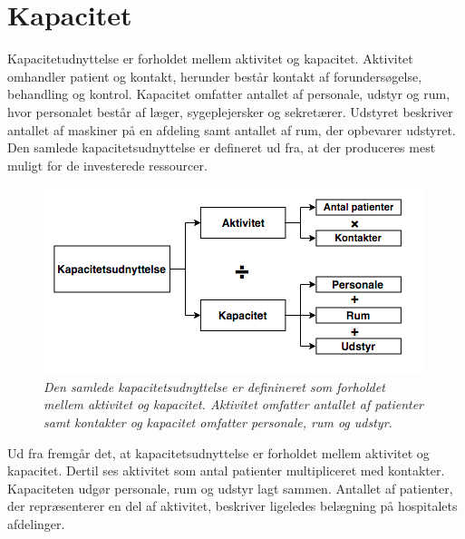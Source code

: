 \section{Kapacitet} \label{sec:kap}
Kapacitetudnyttelse er forholdet mellem aktivitet og kapacitet. Aktivitet omhandler patient og kontakt, herunder består kontakt af forundersøgelse, behandling og kontrol. Kapacitet omfatter antallet af personale, udstyr og rum, hvor personalet består af læger, sygeplejersker og sekretærer. Udstyret beskriver antallet af maskiner på en afdeling samt antallet af rum, der opbevarer udstyret. Den samlede kapacitetsudnyttelse er defineret ud fra, at der produceres mest muligt for de investerede ressourcer.\cite{Company2013} 

\begin{figure}[H]
	\flushleft 
	\centering
	\includegraphics[scale=1]{figures/Kapacitetsudnyttelse.png}
	\flushleft
	\caption{\textit{Den samlede kapacitetsudnyttelse er definineret som forholdet mellem aktivitet og kapacitet. Aktivitet omfatter antallet af patienter samt kontakter og kapacitet omfatter personale, rum og udstyr.}\cite{Company2013}}
	\label{kapacitet}
\end{figure}

\noindent
Ud fra  fremgår det, at kapacitetsudnyttelse er forholdet mellem aktivitet og kapacitet. Dertil ses aktivitet som antal patienter multipliceret med kontakter. Kapaciteten udgør personale, rum og udstyr lagt sammen. Antallet af patienter, der repræsenterer en del af aktivitet, beskriver ligeledes belægning på hospitalets afdelinger.\cite{Company2013} 

